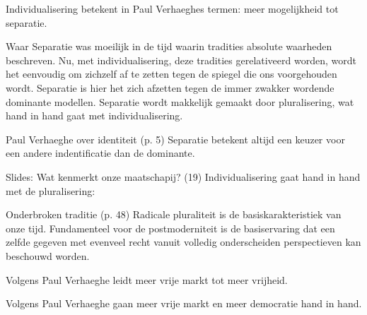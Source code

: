 \documentclass[main.tex]{subfiles}
\begin{document}
\begin{examenvraag}
    \begin{stelling}
        Individualisering betekent in Paul Verhaeghes termen: meer mogelijkheid tot separatie.
    \end{stelling}

    \begin{stelling-antwoord}{Waar}
        Separatie was moeilijk in de tijd waarin tradities absolute waarheden beschreven.
        Nu, met individualisering, deze tradities gerelativeerd worden, wordt het eenvoudig om zichzelf af te zetten tegen de spiegel die ons voorgehouden wordt.
        Separatie is hier het zich afzetten tegen de immer zwakker wordende dominante modellen.
        Separatie wordt makkelijk gemaakt door pluralisering, wat hand in hand gaat met individualisering.
        \begin{citaat}{Paul Verhaeghe over identiteit (p. 5)}
            Separatie betekent altijd een keuzer voor een andere indentificatie dan de dominante.
        \end{citaat}
        \begin{citaat}{Slides: Wat kenmerkt onze maatschapij? (19)}
            Individualisering gaat hand in hand met de pluralisering:
        \end{citaat}
        \begin{citaat}{Onderbroken traditie (p. 48)}
            Radicale pluraliteit is de basiskarakteristiek van onze tijd.
            Fundamenteel voor de postmoderniteit is de basiservaring dat een zelfde gegeven met evenveel recht vanuit volledig onderscheiden perspectieven kan beschouwd worden.
        \end{citaat}
    \end{stelling-antwoord}
\end{examenvraag}


\begin{examenvraag}
    \begin{stelling}
        Volgens Paul Verhaeghe leidt meer vrije markt tot meer vrijheid.
    \end{stelling}

    \begin{antwoord}
    \end{antwoord}
\end{examenvraag}


\begin{examenvraag}
    \begin{stelling}
        Volgens Paul Verhaeghe gaan meer vrije markt en meer democratie hand in hand.
    \end{stelling}

    \begin{antwoord}
    \end{antwoord}
\end{examenvraag}
\end{document}
